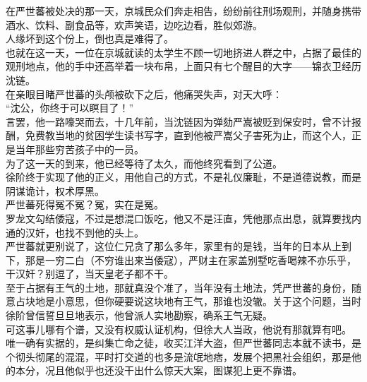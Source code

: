 \begin{multicols}{\theparacolNo}
在严世蕃被处决的那一天，京城民众们奔走相告，纷纷前往刑场观刑，并随身携带酒水、饮料、副食品等，欢声笑语，边吃边看，胜似郊游。\\

人缘坏到这个份上，倒也真是难得了。\\

也就在这一天，一位在京城就读的太学生不顾一切地挤进人群之中，占据了最佳的观刑地点，他的手中还高举着一块布帛，上面只有七个醒目的大字——锦衣卫经历沈链。\\

在亲眼目睹严世蕃的头颅被砍下之后，他痛哭失声，对天大呼：\\

“沈公，你终于可以瞑目了！”\\

言罢，他一路嚎哭而去，十几年前，当沈链因为弹劾严嵩被贬到保安时，曾不计报酬，免费教当地的贫困学生读书写字，直到他被严嵩父子害死为止，而这个人，正是当年那些穷苦孩子中的一员。\\

为了这一天的到来，他已经等待了太久，而他终究看到了公道。\\

徐阶终于实现了他的正义，用他自己的方式，不是礼仪廉耻，不是道德说教，而是阴谋诡计，权术厚黑。\\

严世蕃死得冤不冤？冤，实在是冤。\\

罗龙文勾结倭寇，不过是想混口饭吃，他又不是汪直，凭他那点出息，就算要找内通的汉奸，也找不到他的头上。\\

严世蕃就更别说了，这位仁兄贪了那么多年，家里有的是钱，当年的日本从上到下，那是一穷二白（不穷谁出来当倭寇），严财主在家盖别墅吃香喝辣不亦乐乎，干汉奸？别逗了，当天皇老子都不干。\\

至于占据有王气的土地，那就真没个准了，当年没有土地法，凭严世蕃的身份，随意占块地是小意思，但你硬要说这块地有王气，那谁也没辙。关于这个问题，当时徐阶曾信誓旦旦地表示，他曾派人实地勘察，确系王气无疑。\\

可这事儿哪有个谱，又没有权威认证机构，但徐大人当政，他说有那就算有吧。\\

唯一确有实据的，是纠集亡命之徒，收买江洋大盗，但严世蕃同志本就不读书，是个彻头彻尾的混混，平时打交道的也多是流氓地痞，发展个把黑社会组织，那是他的本分，况且他似乎也还没干出什么惊天大案，图谋犯上更不靠谱。\\


\end{multicols}
